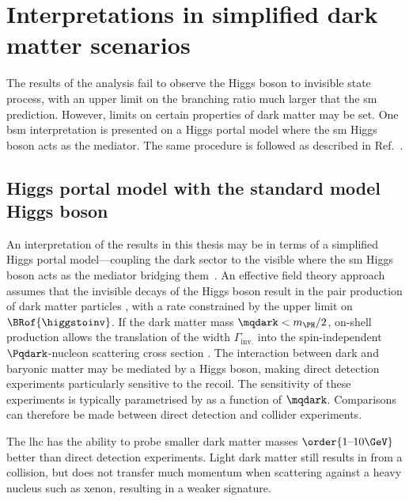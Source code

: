 \section{Interpretations in simplified dark matter scenarios}
\label{sec:htoinv_dark_matter_models}

The results of the analysis fail to observe the Higgs boson to invisible state process, with an upper limit on the branching ratio much larger that the \acrlong{sm} prediction. However, limits on certain properties of dark matter may be set. One \acrshort{bsm} interpretation is presented on a Higgs portal model where the \acrshort{sm} Higgs boson acts as the mediator. The same procedure is followed as described in Ref.~.




\subsection{Higgs portal model with the standard model Higgs boson}
\label{subsec:htoinv_dark_matter_higgs_portal}

An interpretation of the results in this thesis may be in terms of a simplified Higgs portal model---coupling the dark sector to the visible where the \acrshort{sm} Higgs boson acts as the mediator bridging them~\cite{Djouadi:2011aa}. An effective field theory approach assumes that the invisible decays of the Higgs boson result in the pair production of dark matter particles \Pqdark, with a rate constrained by the upper limit on $\BRof{\higgstoinv}$. If the dark matter mass $\mqdark < m_{\PH}/\text{2}$, on-shell production allows the translation of the \higgstoinv width $\Gamma_{\mathrm{inv.}}$ into the spin-independent $\Pqdark$-nucleon scattering cross section \xsecSI. The interaction between dark and baryonic matter may be mediated by a Higgs boson, making direct detection experiments particularly sensitive to the recoil. The sensitivity of these experiments is typically parametrised by \xsecSI as a function of $\mqdark$. Comparisons can therefore be made between direct detection and collider experiments.

The \acrshort{lhc} has the ability to probe smaller dark matter masses $\order{\text{1--10}\GeV}$ better than direct detection experiments. Light dark matter still results in \ptvecmiss from a collision, but does not transfer much momentum when scattering against a heavy nucleus such as xenon, resulting in a weaker signature.

